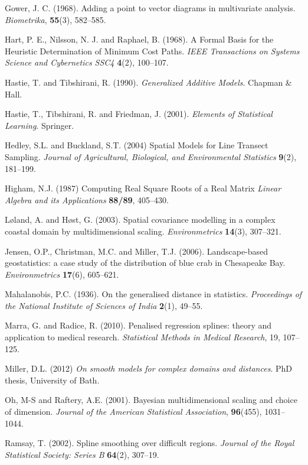 \documentclass[useAMS, referee]{biom}
\begin{document}
\begin{thebibliography}{99}
\bibitem{} Gower, J. C. (1968). Adding a point to vector diagrams in multivariate analysis. \textit{Biometrika}, \textbf{55}(3), 582--585.

\bibitem{} Hart, P. E., Nilsson, N. J. and Raphael, B. (1968). A Formal Basis for the Heuristic Determination of Minimum Cost Paths. \textit{IEEE Transactions on Systems Science and Cybernetics SSC4} \textbf{4}(2), 100--107.

\bibitem{} Hastie, T. and Tibshirani, R. (1990). \textit{Generalized Additive Models}. Chapman \& Hall.

\bibitem{} Hastie, T., Tibshirani, R. and Friedman, J. (2001). \textit{Elements of Statistical Learning}. Springer.

\bibitem{ } Hedley, S.L. and Buckland, S.T. (2004) Spatial Models for Line Transect Sampling. \textit{Journal of Agricultural, Biological, and Environmental Statistics} \textbf{9}(2), 181--199.

\bibitem{ } Higham, N.J. (1987) Computing Real Square Roots of a Real Matrix
 \textit{Linear Algebra and its Applications} \textbf{88/89}, 405--430.


\bibitem{} L{\o}land, A. and H{\o}st, G. (2003). Spatial covariance modelling in a complex coastal domain by multidimensional scaling. \textit{Environmetrics} \textbf{14}(3), 307--321.

\bibitem{} Jensen, O.P., Christman, M.C. and Miller, T.J. (2006). Landscape-based geostatistics: a case study of the distribution of blue crab in {C}hesapeake {B}ay. \textit{Environmetrics} \textbf{17}(6), 605--621.

\bibitem{} Mahalanobis, P.C. (1936). On the generalised distance in statistics. \textit{Proceedings of the National Institute of Sciences of India} \textbf{2}(1), 49--55.

\bibitem{} Marra, G. and Radice, R. (2010). Penalised regression splines: theory and application to medical research. \textit{Statistical Methods in Medical Research}, 19, 107--125.

\bibitem{} Miller, D.L. (2012) \textit{On smooth models for complex domains and distances}. PhD thesis, University of Bath.

\bibitem{} Oh, M-S and Raftery, A.E. (2001). Bayesian multidimensional scaling and choice of dimension. \textit{Journal of the American Statistical Association}, \textbf{96}(455), 1031--1044.

\bibitem{} Ramsay, T. (2002). Spline smoothing over difficult regions. \textit{Journal of the Royal Statistical Society: Series B} \textbf{64}(2), 307--19.


\end{thebibliography}
\end{document}

